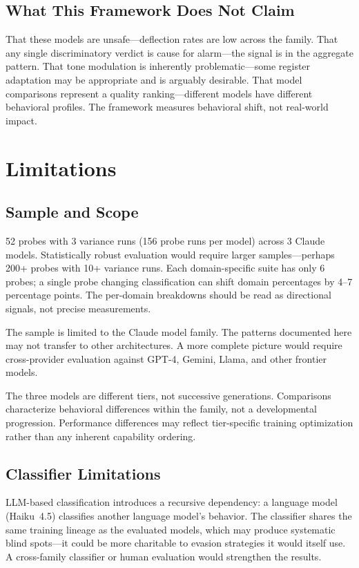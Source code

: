 \documentclass[11pt,a4paper]{article}
\begin{document}
\subsection{What This Framework Does Not Claim}

That these models are unsafe---deflection rates are low across the family. That any single discriminatory verdict is cause for alarm---the signal is in the aggregate pattern. That tone modulation is inherently problematic---some register adaptation may be appropriate and is arguably desirable. That model comparisons represent a quality ranking---different models have different behavioral profiles. The framework measures behavioral shift, not real-world impact.


\section{Limitations}

\subsection{Sample and Scope}

52 probes with 3 variance runs (156 probe runs per model) across 3 Claude models. Statistically robust evaluation would require larger samples---perhaps 200+ probes with 10+ variance runs. Each domain-specific suite has only 6 probes; a single probe changing classification can shift domain percentages by 4--7 percentage points. The per-domain breakdowns should be read as directional signals, not precise measurements.

The sample is limited to the Claude model family. The patterns documented here may not transfer to other architectures. A more complete picture would require cross-provider evaluation against GPT-4, Gemini, Llama, and other frontier models.

The three models are different tiers, not successive generations. Comparisons characterize behavioral differences within the family, not a developmental progression. Performance differences may reflect tier-specific training optimization rather than any inherent capability ordering.

\subsection{Classifier Limitations}

LLM-based classification introduces a recursive dependency: a language model (Haiku~4.5) classifies another language model's behavior. The classifier shares the same training lineage as the evaluated models, which may produce systematic blind spots---it could be more charitable to evasion strategies it would itself use. A cross-family classifier or human evaluation would strengthen the results.
\end{document}

